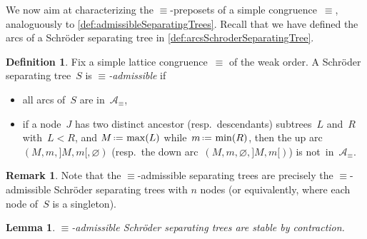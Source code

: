 \documentclass{amsart}
\newtheorem{lemma}[theorem]{Lemma}
\theoremstyle{definition}
\newtheorem{definition}[theorem]{Definition}
\newtheorem{remark}[theorem]{Remark}
\newcommand{\eqdef}{\mbox{\,\raisebox{0.2ex}{\scriptsize\ensuremath{\mathrm:}}\ensuremath{=}\,}} %
\newcommand{\darkblue}{\color{darkblue}} %
\newcommand{\defn}[1]{\textsl{\darkblue #1}} %
\newcommand{\arcs}{{\mathcal{A}}} %
\begin{document}
We now aim at characterizing the $\equiv$-preposets of a simple congruence~$\equiv$, analoguously to \cref{def:admissibleSeparatingTrees}.
Recall that we have defined the arcs of a Schröder separating tree in \cref{def:arcsSchroderSeparatingTree}.

\begin{definition}
\label{def:admissibleSchroderSeparatingTrees}
Fix a simple lattice congruence~$\equiv$ of the weak order.
A Schröder separating tree~$S$ is \defn{$\equiv$-admissible} if
\begin{itemize}
\item all arcs of~$S$ are in~$\arcs_\equiv$,
\item if a node~$J$ has two distinct ancestor (resp.~descendants) subtrees~$L$ and~$R$ with~$L < R$, and $M \eqdef \max(L)$ while~$m \eqdef \min(R)$, then the up arc~$(M, m, {]M,m[}, \varnothing)$ (resp.~the down arc~$(M, m, \varnothing, {]M,m[})$) is not~in~$\arcs_\equiv$.
\end{itemize}
\end{definition}

\begin{remark}
Note that the $\equiv$-admissible separating trees are precisely the $\equiv$-admissible Schröder separating trees with $n$ nodes (or equivalently, where each node of~$S$ is a singleton).
\end{remark}

\begin{lemma}
\label{lem:contractionAdmissibleSchroderSeparatingTree}
$\equiv$-admissible Schröder separating trees are stable by contraction.
\end{lemma}
\end{document}
